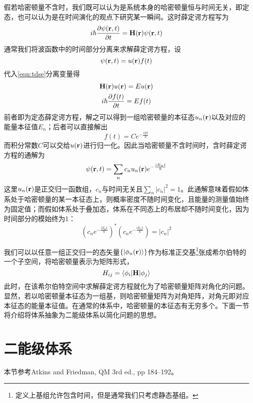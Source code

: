 假若哈密顿量不含时，我们既可以认为是系统本身的哈密顿量恒与时间无关，即定态，也可以认为是在时间演化的观点下研究某一瞬间。这时薛定谔方程写为
\begin{equation}\label{eqn:tdse}
i\hbar \dfrac{\partial \psi(\bm{\mathrm{r}},t)}{\partial t}=\bm{\mathrm{H}}(\bm{\mathrm{r}}) \psi(\bm{\mathrm{r}},t)
\end{equation}
通常我们将波函数中的时间部分分离来求解薛定谔方程，设
\begin{equation}\label{key}
\psi(\bm{\mathrm{r}},t)=u(\bm{\mathrm{r}})f(t)
\end{equation}
代入\eqref{eqn:tdse}分离变量得
\begin{gather}
\bm{\mathrm{H}}(\bm{\mathrm{r}}) u(\bm{\mathrm{r}})=E u(\bm{\mathrm{r}})\label{eqn:TISE}\\
i\hbar \dfrac{\partial f(t)}{\partial t}=Ef(t)\label{eqn:timepart}
\end{gather}
前者即为定态薛定谔方程，解之可以得到一组哈密顿量的本征态$ u_n(\bm{\mathrm{r}}) $以及对应的能量本征值$ E_n $；后者可以直接解出
\begin{equation}\label{key}
f(t)=Ce^{-\frac{iEt}{\hbar}}
\end{equation}
而积分常数$ C $可以交给$ u(\bm{\mathrm{r}}) $进行归一化。因此当哈密顿量不含时间时，含时薛定谔方程的通解为
\begin{equation}\label{key}
\psi(\bm{\mathrm{r}},t)=\sum_nc_nu_n(\bm{\mathrm{r}})e^{-\frac{iE_nt}{\hbar}}
\end{equation}
这里$ u_n(\bm{\mathrm{r}}) $是正交归一函数组，$ c_n $与时间无关且$ \sum_n |c_n|^2=1 $。此通解意味着假如体系处于哈密顿量的某一本征态上，则概率密度不随时间变化，且能量的测量值始终为固定值；而假如体系处于叠加态，体系在不同态上的布居却不随时间变化，因为时间部分的模始终为1：
\begin{equation}\label{key}
(c_ne^{-\frac{iE_nt}{\hbar}})^*(c_ne^{-\frac{iE_nt}{\hbar}})=|c_n|^2
\end{equation}

我们可以以任意一组正交归一的态矢量$ \{|\phi_n(\bm{\mathrm{r}})\rangle\} $作为标准正交基\footnote{定义上基组允许包含时间，但是通常我们只考虑静态基组。}张成希尔伯特的一个子空间，将哈密顿量表示为矩阵形式，
\begin{equation}\label{key}
 H_{ij}=\langle \phi_i|\bm{\mathrm{H}}|\phi_j\rangle
\end{equation}
此时，在该希尔伯特空间中求解薛定谔方程就化为了哈密顿量矩阵对角化的问题。显然，若以哈密顿量本征态为一组基，则哈密顿量矩阵为对角矩阵，对角元即对应本征态的能量本征值。在通常的体系中，哈密顿量的本征态有无穷多个。下面一节将介绍将体系抽象为二能级体系以简化问题的思想。

\section{二能级体系}
\begin{framed}
本节参考Atkins and Friedman, QM 3rd ed., pp 184--192。
\end{framed}

